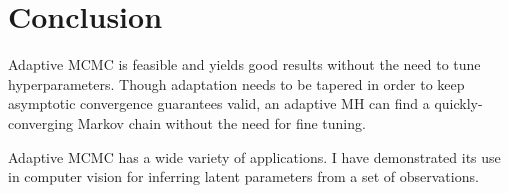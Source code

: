 \documentclass[11pt]{article}
\begin{document}
\section{Conclusion}

Adaptive MCMC is feasible and yields good results without the need to tune hyperparameters. Though adaptation needs to be tapered in order to keep asymptotic convergence guarantees valid, an adaptive MH can find a quickly-converging Markov chain without the need for fine tuning.

Adaptive MCMC has a wide variety of applications. I have demonstrated its use in computer vision for inferring latent parameters from a set of observations.

\nocite{*}


\end{document}
